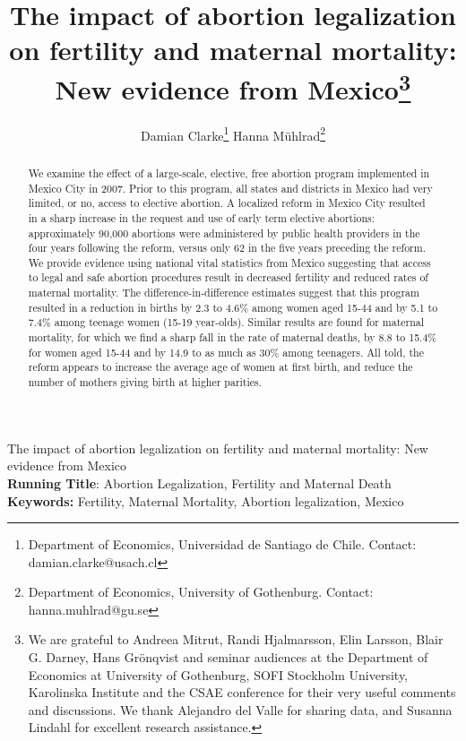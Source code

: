 \documentclass[a4paper, 11pt]{article}
\title{The impact of abortion legalization on fertility and maternal mortality: New evidence from Mexico\thanks{We are grateful to Andreea Mitrut, Randi Hjalmarsson, Elin Larsson, Blair G. Darney, Hans Gr\"onqvist and seminar audiences at the Department of Economics at University of Gothenburg,  SOFI Stockholm University, Karolinska Institute and the CSAE conference for their very useful comments and discussions.  We thank Alejandro del Valle for sharing data, and Susanna Lindahl for excellent research assistance.}}
\author{Damian Clarke\thanks{Department of Economics, Universidad de Santiago de Chile.  Contact: damian.clarke@usach.cl} \hspace{1cm} Hanna Mühlrad\thanks{Department of Economics, University of Gothenburg. Contact: hanna.muhlrad@gu.se}}
\begin{document}
\maketitle
\newpage
{}

\begin{spacing}{2}
\begin{center}
  {\Large The impact of abortion legalization on fertility and maternal mortality: New evidence from Mexico}
  \\
\vspace{5mm}
  \textbf{Running Title}: Abortion Legalization, Fertility and Maternal Death \\
\textbf{Keywords:} Fertility, Maternal Mortality, Abortion legalization, Mexico

\end{center}

\newpage

\begin{abstract}
\noindent We examine the effect of a large-scale, elective, free abortion program implemented in Mexico City in 2007. Prior to this program, all states and districts in Mexico had very limited, or no, access to elective abortion. A localized reform in Mexico City resulted in a sharp increase in the request and use of early term elective abortions: approximately 90,000 abortions were administered by public health providers in the four years following the reform, versus only 62 in the five years preceding the reform. We provide evidence using national vital statistics from Mexico suggesting that access to legal and safe abortion procedures result in decreased fertility and reduced rates of maternal mortality. The difference-in-difference estimates suggest that this program resulted in a reduction in births by 2.3 to 4.6\% among women aged 15-44 and by 5.1 to 7.4\% among teenage women (15-19 year-olds). Similar results are found for maternal mortality, for which we find a sharp fall in the rate of maternal deaths, by 8.8 to 15.4\% for women aged 15-44 and by 14.9 to as much as 30\% among teenagers.  All told, the reform appears to increase the average age of women at first birth, and reduce the number of mothers giving birth at higher parities.
\end{abstract}



\newpage 

\end{spacing}
\end{document}
